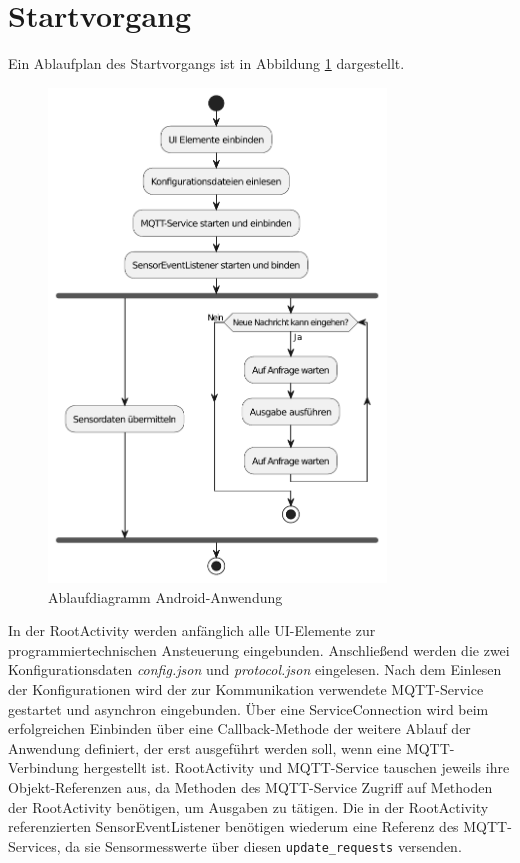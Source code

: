 \documentclass[11pt,a4paper]{report}
\begin{document}
\section{Startvorgang}
Ein Ablaufplan des Startvorgangs ist in Abbildung \ref{fig:app_flow} dargestellt.
\begin{figure}[htbp]
  \centering
  \includegraphics[width=0.8\textwidth]{images/app_ablauf}
  \caption{Ablaufdiagramm Android-Anwendung}
  \label{fig:app_flow}
\end{figure}
In der RootActivity werden anfänglich alle UI-Elemente zur programmiertechnischen Ansteuerung eingebunden.
Anschließend werden die zwei Konfigurationsdaten \textit{config.json} und \textit{protocol.json} eingelesen.
Nach dem Einlesen der Konfigurationen wird der zur Kommunikation verwendete MQTT-Service gestartet und asynchron eingebunden.
Über eine ServiceConnection wird beim erfolgreichen Einbinden über eine Callback-Methode der weitere Ablauf der Anwendung definiert, der erst ausgeführt werden soll, wenn eine MQTT-Verbindung hergestellt ist.
RootActivity und MQTT-Service tauschen jeweils ihre Objekt-Referenzen aus, da Methoden des MQTT-Service Zugriff auf  Methoden der RootActivity benötigen, um Ausgaben zu tätigen.
Die in der RootActivity referenzierten SensorEventListener benötigen wiederum eine Referenz des MQTT-Services, da sie Sensormesswerte über diesen \texttt{update\_requests} versenden.
\end{document}
